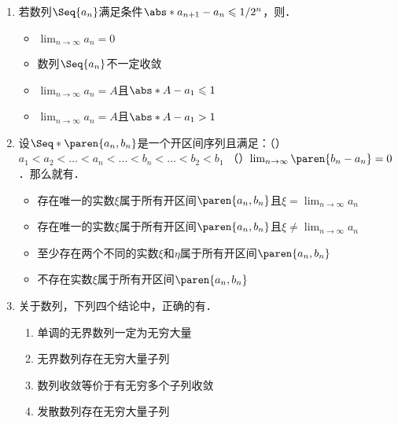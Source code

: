 \documentclass[a4paper,punct=CCT]{ctexbook}
\renewcommand*{\enumparen}[1]{（\makebox[0.6em][c]{\normalfont#1}）}
\theoremstyle{definition}
\theoremstyle{remark}
\newif\ifshowsol
\let\leq\leqslant
\let\le\leq
\begin{document}
\begin{enumerate}
\item 若数列\(\Seq{a_n}\)满足条件\(\abs*{a_{n+1} - a_n} \le 1/2^n\)，则\uline{\makebox[6em]{}}．
  \begin{itemize}
    \renewcommand{\labelitemi}{\faCircleThin}
  \item \(\lim_{n\to\infty} a_n = 0\)
  \item 数列\(\Seq{a_n}\)不一定收敛
    \ifshowsol
  \item[\faCircle]
    \else
  \item
    \fi
    \(\lim_{n\to\infty} a_n = A\)且\(\abs*{A - a_1} \le 1\)
  \item \(\lim_{n\to\infty} a_n = A\)且\(\abs*{A - a_1} > 1\)
  \end{itemize}

  \ifshowsol
  选项A可以有反例\(a_n = 1\)来说明．选项B可以由三角不等式推出这个数列是柯西列，进而收敛．选项C可以先推出\(\abs*{a_n - a_1} \le 1 - 1/2^{n-1}\)，然后用反证法说明\(\abs*{A - a_1} \ngtr 1\)．
  \fi

\item 设\(\Seq*{\paren{a_n, b_n}}\)是一个开区间序列且满足：\enumparen{1}\(a_1 < a_2 < \dots < a_n < \dots < b_n < \dots < b_2 < b_1\) \enumparen{2}\(\lim_{n\to\infty} \paren{b_n - a_n} = 0\)．那么就有\uline{\makebox[10em]{}}．
  \begin{itemize}
    \renewcommand{\labelitemi}{\faCircleThin}
    \ifshowsol
  \item[\faCircle]
    \else
  \item
    \fi
    存在唯一的实数\(ξ\)属于所有开区间\(\paren{a_n, b_n}\)且\(ξ = \lim_{n\to\infty} a_n\)
  \item 存在唯一的实数\(ξ\)属于所有开区间\(\paren{a_n, b_n}\)且\(ξ \ne \lim_{n\to\infty} a_n\)
  \item 至少存在两个不同的实数\(ξ\)和\(η\)属于所有开区间\(\paren{a_n, b_n}\)
  \item 不存在实数\(ξ\)属于所有开区间\(\paren{a_n, b_n}\)
  \end{itemize}

  \ifshowsol
  可以参考区间套定理的证明方式．
  \fi

\item 关于数列，下列四个结论中，正确的有\uline{\makebox[6em]{%
      \ifshowsol
      \enumparen{1}%
      \enumparen{2}
      \fi}}．
  \begin{enumerate}
    \renewcommand{\labelenumii}{\enumparen{\arabic{enumii}}}
  \item 单调的无界数列一定为无穷大量
  \item 无界数列存在无穷大量子列
  \item 数列收敛等价于有无穷多个子列收敛
  \item 发散数列存在无穷大量子列
  \end{enumerate}


\end{enumerate}
\end{document}
